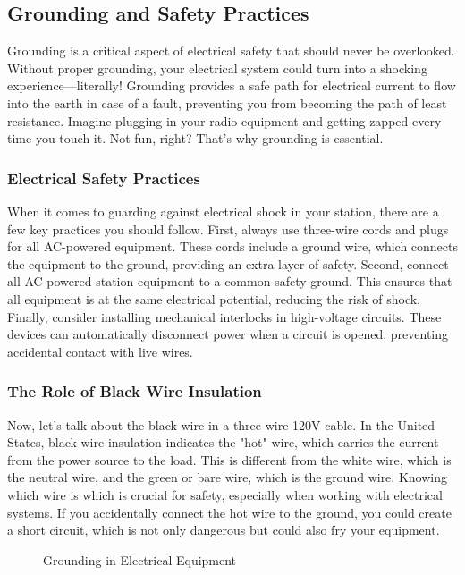 \subsection{Grounding and Safety Practices}
\label{subsec:ground-safety}

Grounding is a critical aspect of electrical safety that should never be overlooked. Without proper grounding, your electrical system could turn into a shocking experience—literally! Grounding provides a safe path for electrical current to flow into the earth in case of a fault, preventing you from becoming the path of least resistance. Imagine plugging in your radio equipment and getting zapped every time you touch it. Not fun, right? That's why grounding is essential.

\subsubsection*{Electrical Safety Practices}
When it comes to guarding against electrical shock in your station, there are a few key practices you should follow. First, always use three-wire cords and plugs for all AC-powered equipment. These cords include a ground wire, which connects the equipment to the ground, providing an extra layer of safety. Second, connect all AC-powered station equipment to a common safety ground. This ensures that all equipment is at the same electrical potential, reducing the risk of shock. Finally, consider installing mechanical interlocks in high-voltage circuits. These devices can automatically disconnect power when a circuit is opened, preventing accidental contact with live wires.

\subsubsection*{The Role of Black Wire Insulation}
Now, let’s talk about the black wire in a three-wire 120V cable. In the United States, black wire insulation indicates the "hot" wire, which carries the current from the power source to the load. This is different from the white wire, which is the neutral wire, and the green or bare wire, which is the ground wire. Knowing which wire is which is crucial for safety, especially when working with electrical systems. If you accidentally connect the hot wire to the ground, you could create a short circuit, which is not only dangerous but could also fry your equipment.

\begin{figure}[h]
    \centering
    \caption{Grounding in Electrical Equipment}
    \label{fig:grounding}
\end{figure}

